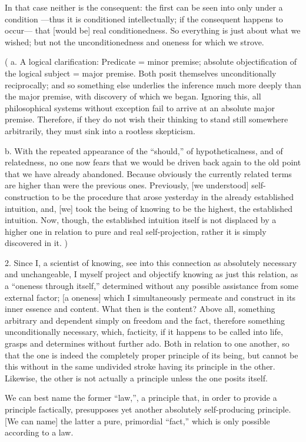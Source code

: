 In that case neither is the consequent:
the first can be seen into only under a condition
—thus it is conditioned intellectually;
if the consequent happens to occur—
that [would be] real conditionedness.
So everything is just about what we wished;
but not the unconditionedness and oneness for which we strove.

(
a. A logical clarification:
Predicate = minor premise;
absolute objectification of the logical subject = major premise.
Both posit themselves unconditionally reciprocally;
and so something else underlies the inference
much more deeply than the major premise,
with discovery of which we began.
Ignoring this, all philosophical systems without exception
fail to arrive at an absolute major premise.
Therefore, if they do not wish their thinking
to stand still somewhere arbitrarily,
they must sink into a rootless skepticism.

b. With the repeated appearance of the “should,”
of hypotheticalness, and of relatedness,
no one now fears that we would be driven back again
to the old point that we have already abandoned.
Because obviously the currently related terms are
higher than were the previous ones.
Previously, [we understood] self-construction to be
the procedure that arose yesterday
in the already established intuition,
and, [we] took the being of knowing
to be the highest, the established intuition.
Now, though, the established intuition itself is not
displaced by a higher one in relation to
pure and real self-projection,
rather it is simply discovered in it.
)

2. Since I, a scientist of knowing,
see into this connection
as absolutely necessary and unchangeable,
I myself project and objectify knowing
as just this relation,
as a “oneness through itself,”
determined without any possible assistance
from some external factor;
[a oneness] which I simultaneously permeate
and construct in its inner essence and content.
What then is the content?
Above all, something arbitrary and
dependent simply on freedom and the fact,
therefore something unconditionally necessary,
which, facticity, if it happens to be called into life,
grasps and determines without further ado.
Both in relation to one another,
so that the one is indeed the completely
proper principle of its being,
but cannot be this without in the same undivided
stroke having its principle in the other.
Likewise, the other is not actually a
principle unless the one posits itself.

We can best name the former “law,”,
a principle that, in order to provide a principle factically,
presupposes yet another absolutely self-producing principle.
[We can name] the latter a pure, primordial “fact,”
which is only possible according to a law.

